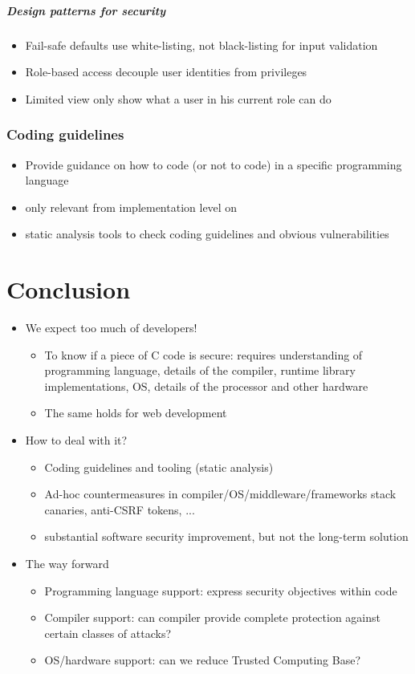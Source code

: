 \documentclass[12pt,titlepage,a4paper]{report}
\begin{document}
	\paragraph{Design patterns for security}
	\begin{itemize}
		\item Fail-safe defaults
			\subitem use white-listing, not black-listing for input validation
		\item Role-based access
			\subitem decouple user identities from privileges
		\item Limited view
			\subitem only show what a user in his current role can do
	\end{itemize}

	\subsection{Coding guidelines}
	\begin{itemize}
		\item[\textrightarrow] Provide guidance on how to code (or not to code) in a specific programming language
		\item only relevant from implementation level on
		\item static analysis tools to check coding guidelines and obvious vulnerabilities
	\end{itemize}

	\chapter{Conclusion}
	\begin{itemize}
		\item We expect too much of developers!
		\begin{itemize}
			\item To know if a piece of C code is secure: requires understanding of programming language, details of the compiler, runtime library implementations, OS, details of the processor and other hardware
			\item The same holds for web development
		\end{itemize}
		\item How to deal with it?
		\begin{itemize}
			\item Coding guidelines and tooling (static analysis)
			\item Ad-hoc countermeasures in compiler/OS/middleware/frameworks
				\subitem stack canaries, anti-CSRF tokens, ...
			\item[\textrightarrow] substantial software security improvement, but not the long-term solution
		\end{itemize}
		\item The way forward
		\begin{itemize}
			\item Programming language support: express security objectives within code
			\item Compiler support: can compiler provide complete protection against certain classes of attacks?
			\item OS/hardware support: can we reduce Trusted Computing Base?
		\end{itemize}
	\end{itemize}
\end{document}
